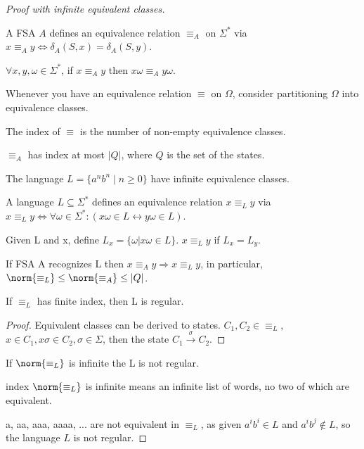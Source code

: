 \begin{proof}[Proof with infinite equivalent classes]

\begin{definition}
A FSA \(A\) defines an equivalence relation
  \(\equiv_A\) on \(\Sigma^*\) via
  \(x\equiv_A y \Leftrightarrow \delta_A(S,x) =  \delta_A(S,y)\).
\end{definition}

\begin{observation}
\(\forall x,y,\omega \in \Sigma^*\), if
  \(x \equiv_A y\) then \(x\omega \equiv_A y\omega\).
\end{observation}

Whenever you have an equivalence relation \(\equiv\) on \(\Omega\), consider partitioning \(\Omega\) into equivalence classes.

The index of \(\equiv\) is the number of non-empty equivalence classes.

\begin{observation}
\(\equiv_A\) has index at most \(|Q|\), where
  \(Q\) is the set of the states.
\end{observation}

The language \(L = \{a^nb^n \mid n \ge 0\}\) have infinite equivalence
  classes.

\begin{definition}[Equivalence]
A language \(L \subseteq \Sigma^*\) defines an
  equivalence relation \(x \equiv_L y\) via
  \(x \equiv_L y \Leftrightarrow \forall \omega \in \Sigma^*: (x\omega\in L \leftrightarrow y\omega \in L)\).
\end{definition}

Given L and x, define \(L_x = \{\omega | x\omega \in L\}\).
  \(x \equiv_L y\) if \(L_x = L_y\).
  
\begin{observation}
If FSA A recognizes L then
  \(x \equiv_A y \Rightarrow x\equiv_L y\), in particular, \(\norm{\equiv_L} \le \norm{\equiv_A} \le |Q|\).
\end{observation}

\begin{theorem}
If \(\equiv_L\) has finite index, then L is regular.
\end{theorem}

\begin{proof}
Equivalent classes can be derived to states. \(C_1, C_2 \in \equiv_L\),
\(x\in C_1, x\sigma \in C_2, \sigma \in \Sigma\), then the state
\(C_1 \overset{\sigma}{\rightarrow} C_2\).
\end{proof}

\begin{corollary}
 If \(\norm{\equiv_L}\) is infinite the L is not
  regular.
\end{corollary}

index \(\norm{\equiv_L}\) is infinite means an infinite list of words, no
  two of which are equivalent.

a, aa, aaa, aaaa, ... are not equivalent in \(\equiv_L\), as
given \(a^ib^i \in L\) and \(a^ib^j \not \in L\), so the language $L$ is not regular.

\end{proof}
